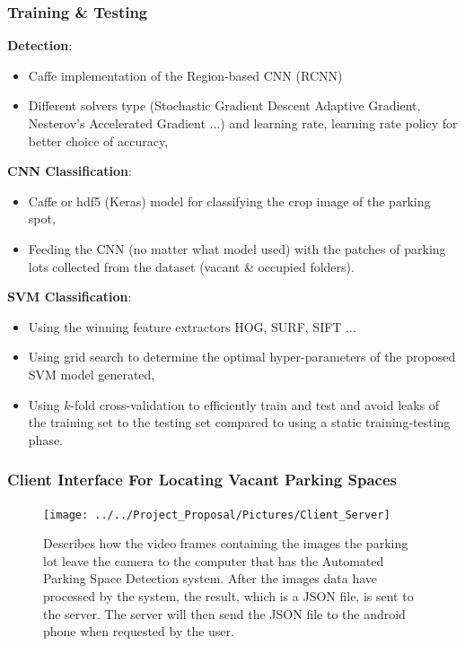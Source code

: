 \documentclass{beamer}
\begin{document}
\begin{frame}[allowframebreaks]
\frametitle{Training \& Testing} 

\textbf{Detection}: 
\begin{itemize}
\item Caffe implementation of the Region-based CNN (RCNN) 
\item Different solvers type (Stochastic Gradient Descent Adaptive Gradient, Nesterov’s Accelerated Gradient ...) and learning rate, learning rate policy for better choice of accuracy,
\end{itemize}
\textbf{CNN Classification}:
\begin{itemize}
	\item Caffe or hdf5 (Keras) model for classifying the crop image of the parking spot,
	\item Feeding the CNN (no matter what model used) with the patches of parking lots collected from the dataset (vacant \& occupied folders).
\end{itemize}
\textbf{SVM Classification}: 
\begin{itemize}
	\item Using the winning feature extractors HOG, SURF, SIFT ...
	\item Using grid search to determine the optimal hyper-parameters of the proposed SVM model generated,
	\item Using $k$-fold cross-validation to efficiently train and test and avoid leaks of the training set to the testing set compared to using a static training-testing phase.
\end{itemize} 

\end{frame}

\begin{frame}[allowframebreaks]
\frametitle{Client Interface For Locating Vacant Parking Spaces}

\begin{figure}
	\centering
	\texttt{[image: ../../Project\_Proposal/Pictures/Client\_Server]}
	\caption{Describes how the video frames containing the images the parking lot leave the camera to the computer that has the Automated Parking Space Detection system. After the images data have processed by the system, the result, which is a JSON file, is sent to the server. The server will then send the JSON file to the android phone when requested by the user.}
	\label{fig:clientserver}
\end{figure}


\end{frame}
\end{document}
